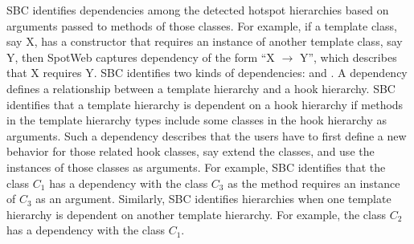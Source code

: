 SBC identifies dependencies among the detected hotspot hierarchies based on arguments
passed to methods of those classes. For example, if a template class, say X, has a constructor that requires
an instance of another template class, say Y, then SpotWeb captures
dependency of the form ``X $\rightarrow$ Y'', which describes that X
requires Y. SBC identifies two kinds of dependencies: 
and . A  dependency defines a relationship
between a template hierarchy and a hook hierarchy. SBC identifies that
a template hierarchy is dependent on a hook hierarchy if methods in the template
hierarchy types include some classes in the hook hierarchy as arguments. Such a dependency describes
that the users have to first define a new behavior for those related hook classes, say
extend the classes, and use the instances of those classes
as arguments. For example, SBC identifies that the class $C_1$ has a 
 dependency with 
the class $C_3$ as the method  requires an instance of $C_3$ 
as an argument. Similarly, SBC identifies 
hierarchies when one template hierarchy is dependent on another template hierarchy.
For example, the class $C_2$ has a  dependency
with the class $C_1$. 

